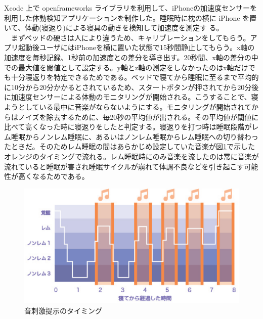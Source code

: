 Xcode 上で openframeworks ライブラリを利用して、iPhoneの加速度センサーを利用した体動検知アプリケーションを制作した。睡眠時に枕の横に iPhone を置いて、体動(寝返り)による寝具の動きを検知して加速度を測定す る。\\
　まずベッドの硬さは人により違うため、キャリブレーションをしてもらう。アプリ起動後ユーザにはiPhoneを横に置いた状態で15秒間静止してもらう。x軸の加速度を毎秒記録、1秒前の加速度との差分を導き出す。20秒間、x軸の差分の中での最大値を閾値として設定する。y軸とz軸の測定をしなかったのはx軸だけでも十分寝返りを特定できるためである。ベッドで寝てから睡眠に至るまで平均的に10分から20分かかるとされているため、スタートボタンが押されてから20分後に加速度センサーによる体動のモニタリングが開始される。こうすることで、寝ようとしている最中に音楽がならないようにする。モニタリングが開始されてからはノイズを除去するために、毎20秒の平均値が出される。その平均値が閾値に比べて高くなった時に寝返りをしたと判定する。寝返りを打つ時は睡眠段階がレム睡眠からノンレム睡眠に、あるいはノンレム睡眠からレム睡眠への切り替わったときだ\cite{negaeri}。そのためレム睡眠の間はあらかじめ設定していた音楽が図\ref{melodyGraph}で示したオレンジのタイミングで流れる。レム睡眠時にのみ音楽を流したのは常に音楽が流れていると睡眠が害され睡眠サイクルが崩れて体調不良などを引き起こす可能性が高くなるためである。

\begin{figure}[htbp]
\begin{center}
\includegraphics[width=15cm]{eps/remNonrem.eps}
\caption{音刺激提示のタイミング}
\label{melodyGraph}
\end{center}
\end{figure}

